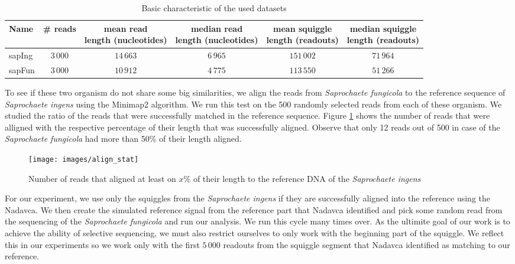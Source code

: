 \begin{table}
\caption[TODO]{Basic characteristic of the used datasets}
\label{tab:datasetChar}
\begin{center}
\begin{tabular}{lccccc}
\hline 
Name & \# reads & \specialcell{mean read\\length (nucleotides)} & \specialcell{median read\\length (nucleotides)} & \specialcell{mean squiggle\\length (readouts)} &  \specialcell{median squiggle\\length (readouts)}\\
\hline
sapIng & $3\,000$ & $14\,663$ & $6\,965$ & $151\,002$ & $71\,964$ \\
sapFun & $3\,000$ & $10\,912$ & $4\,775$ & $113\,550$ & $51\,266$ \\
\hline
\end{tabular}
\end{center}
\end{table}

To see if these two organism do not share some big similarities, we align the reads from
\emph{Saprochaete fungicola} to the reference sequence of \emph{Saprochaete ingens} using the Minimap2
algorithm. We run this test on the 500 randomly selected reads from each of these organism. We studied
the ratio of the reads that were successfully matched in the reference sequence. Figure \ref{obr:align_stat}
shows the number of reads that were alligned with the respective percentage of their length that was successfully aligned.
Observe that only 12 reads out of 500 in case of the \emph{Saprochaete fungicola} had more than 50\% of their length aligned.

\begin{figure}
\centerline{\texttt{[image: images/align\_stat]}}
\caption[TODO]{Number of reads that aligned at least on $x$\% of their length to the reference DNA of the \emph{Saprochaete ingens}}
\label{obr:align_stat}
\end{figure}

For our experiment, we use only the squiggles from the \emph{Saprochaete ingens} if they
are successfully aligned into the reference using the Nadavca. We then create the
simulated reference signal from the reference part that Nadavca identified and pick
some random read from the sequencing of the \emph{Saprochaete fungicola} and run our analysis.
We run this cycle many times over. As the ultimite goal of our work is to achieve
the ability of selective sequencing, we must also restrict ourselves to only work with
the beginning part of the squiggle. We reflect this in our experiments so we
work only with the first $5\,000$ readouts from the squiggle segment that Nadavca identified
as matching to our reference.

